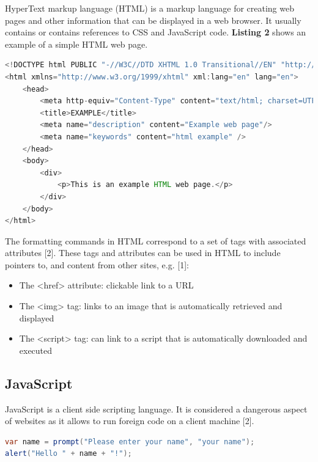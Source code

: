 HyperText markup language (HTML) is a markup language for creating web pages and other information that can be displayed in a web browser. It usually contains or contains references to CSS and JavaScript code. \textbf{Listing 2} shows an example of a simple HTML web page.

\begin{lstlisting}[language=java, caption=An example HTML web page., label=listing:]
<!DOCTYPE html PUBLIC "-//W3C//DTD XHTML 1.0 Transitional//EN" "http://www.w3.org/TR/xhtml1/DTD/xhtml1-transitional.dtd">
<html xmlns="http://www.w3.org/1999/xhtml" xml:lang="en" lang="en">
    <head>
        <meta http-equiv="Content-Type" content="text/html; charset=UTF-8"/>
        <title>EXAMPLE</title>
        <meta name="description" content="Example web page"/>
        <meta name="keywords" content="html example" />
    </head>
    <body>
        <div>
            <p>This is an example HTML web page.</p>
        </div>
    </body>
</html>
\end{lstlisting}

The formatting commands in HTML correspond to a set of tags with associated attributes [2]. These tags and attributes can be used in HTML to include pointers to, and content from other sites, e.g. [1]:
\begin{itemize}
	\item The <href> attribute: clickable link to a URL
	\item The <img> tag: links to an image that is automatically retrieved and displayed
	\item The <script> tag: can link to a script that is automatically  downloaded and executed
\end{itemize}


\subsection{JavaScript}

JavaScript is a client side scripting language. It is considered a dangerous aspect of websites as it allows to run foreign code on a client machine [2].

\begin{lstlisting}[language=java, caption=A simple JavaScript script to welcome a user., label=listing:]
var name = prompt("Please enter your name", "your name");
alert("Hello " + name + "!");
\end{lstlisting}





